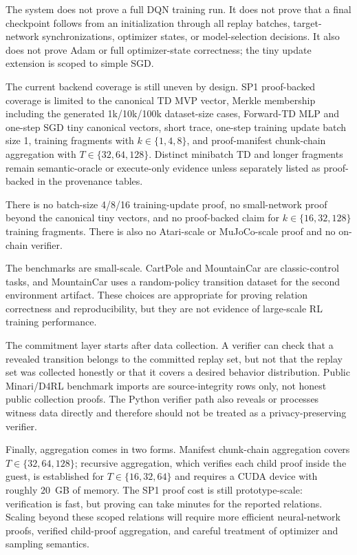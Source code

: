 The system does not prove a full DQN training run. It does not prove that a
final checkpoint follows from an initialization through all replay batches,
target-network synchronizations, optimizer states, or model-selection decisions.
It also does not prove Adam or full optimizer-state correctness; the tiny update
extension is scoped to simple SGD.

The current backend coverage is still uneven by design. SP1 proof-backed
coverage is limited to the canonical TD MVP vector, Merkle membership including
the generated 1k/10k/100k dataset-size cases, Forward-TD MLP and one-step SGD
tiny canonical vectors, short trace, one-step training update batch size 1,
training fragments with $k\in\{1,4,8\}$, and proof-manifest chunk-chain
aggregation with $T\in\{32,64,128\}$. Distinct minibatch TD and longer
fragments remain semantic-oracle or execute-only evidence unless separately
listed as proof-backed in the provenance tables.

There is no batch-size 4/8/16 training-update proof, no small-network proof
beyond the canonical tiny vectors, and no proof-backed claim for
$k\in\{16,32,128\}$ training fragments. There is also no Atari-scale or
MuJoCo-scale proof and no on-chain verifier.

The benchmarks are small-scale. CartPole and MountainCar are classic-control
tasks, and MountainCar uses a random-policy transition dataset for the second
environment artifact. These choices are appropriate for proving relation
correctness and reproducibility, but they are not evidence of large-scale RL
training performance.

The commitment layer starts after data collection. A verifier can check that a
revealed transition belongs to the committed replay set, but not that the replay
set was collected honestly or that it covers a desired behavior distribution.
Public Minari/D4RL benchmark imports are source-integrity rows only, not honest
public collection proofs.
The Python verifier path also reveals or processes witness data directly and
therefore should not be treated as a privacy-preserving verifier.

Finally, aggregation comes in two forms. Manifest chunk-chain aggregation
covers $T\in\{32,64,128\}$; recursive aggregation, which verifies each child
proof inside the guest, is established for $T\in\{16,32,64\}$ and requires a
CUDA device with roughly $20$~GB of memory. The SP1 proof cost is still
prototype-scale: verification is fast, but proving can take minutes for the
reported relations.
Scaling beyond these scoped relations will require more efficient
neural-network proofs, verified child-proof aggregation, and careful treatment
of optimizer and sampling semantics.
